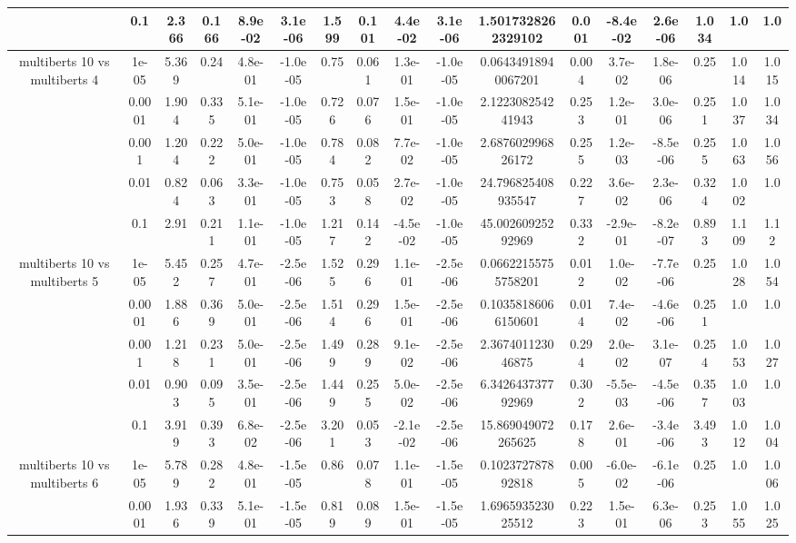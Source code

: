 \begin{tabular}{|c|c|c|c|c|c|c|c|c|c|c|c|c|c|c|c|c|}
 & 0.1 & 2.366 & 0.166 & 8.9e-02 & 3.1e-06 & 1.599 & 0.101 & 4.4e-02 & 3.1e-06 & 1.5017328262329102 & 0.001 & -8.4e-02 & 2.6e-06 & 1.034 & 1.0 & 1.0 \\
\hline
\multirow{5}{*}{multiberts 10 vs multiberts 4} & 1e-05 & 5.369 & 0.24 & 4.8e-01 & -1.0e-05 & 0.75 & 0.061 & 1.3e-01 & -1.0e-05 & 0.06434918940067201 & 0.004 & 3.7e-02 & 1.8e-06 & 0.25 & 1.014 & 1.015 \\
 & 0.0001 & 1.904 & 0.335 & 5.1e-01 & -1.0e-05 & 0.726 & 0.076 & 1.5e-01 & -1.0e-05 & 2.122308254241943 & 0.253 & 1.2e-01 & 3.0e-06 & 0.251 & 1.037 & 1.034 \\
 & 0.001 & 1.204 & 0.222 & 5.0e-01 & -1.0e-05 & 0.784 & 0.082 & 7.7e-02 & -1.0e-05 & 2.687602996826172 & 0.255 & 1.2e-03 & -8.5e-06 & 0.255 & 1.063 & 1.056 \\
 & 0.01 & 0.824 & 0.063 & 3.3e-01 & -1.0e-05 & 0.753 & 0.058 & 2.7e-02 & -1.0e-05 & 24.796825408935547 & 0.227 & 3.6e-02 & 2.3e-06 & 0.324 & 1.002 & 1.0 \\
 & 0.1 & 2.91 & 0.211 & 1.1e-01 & -1.0e-05 & 1.217 & 0.142 & -4.5e-02 & -1.0e-05 & 45.00260925292969 & 0.332 & -2.9e-01 & -8.2e-07 & 0.893 & 1.109 & 1.12 \\
\hline
\multirow{5}{*}{multiberts 10 vs multiberts 5} & 1e-05 & 5.452 & 0.257 & 4.7e-01 & -2.5e-06 & 1.525 & 0.296 & 1.1e-01 & -2.5e-06 & 0.06622155755758201 & 0.012 & 1.0e-02 & -7.7e-06 & 0.25 & 1.028 & 1.054 \\
 & 0.0001 & 1.886 & 0.369 & 5.0e-01 & -2.5e-06 & 1.514 & 0.296 & 1.5e-01 & -2.5e-06 & 0.10358186066150601 & 0.014 & 7.4e-02 & -4.6e-06 & 0.251 & 1.0 & 1.0 \\
 & 0.001 & 1.218 & 0.231 & 5.0e-01 & -2.5e-06 & 1.499 & 0.289 & 9.1e-02 & -2.5e-06 & 2.367401123046875 & 0.294 & 2.0e-02 & 3.1e-07 & 0.254 & 1.053 & 1.027 \\
 & 0.01 & 0.903 & 0.095 & 3.5e-01 & -2.5e-06 & 1.449 & 0.255 & 5.0e-02 & -2.5e-06 & 6.342643737792969 & 0.302 & -5.5e-03 & -4.5e-06 & 0.357 & 1.003 & 1.0 \\
 & 0.1 & 3.919 & 0.393 & 6.8e-02 & -2.5e-06 & 3.201 & 0.053 & -2.1e-02 & -2.5e-06 & 15.869049072265625 & 0.178 & 2.6e-01 & -3.4e-06 & 3.493 & 1.012 & 1.004 \\
\hline
\multirow{5}{*}{multiberts 10 vs multiberts 6} & 1e-05 & 5.789 & 0.282 & 4.8e-01 & -1.5e-05 & 0.86 & 0.078 & 1.1e-01 & -1.5e-05 & 0.102372787892818 & 0.005 & -6.0e-02 & -6.1e-06 & 0.25 & 1.0 & 1.006 \\
 & 0.0001 & 1.936 & 0.339 & 5.1e-01 & -1.5e-05 & 0.819 & 0.089 & 1.5e-01 & -1.5e-05 & 1.696593523025512 & 0.223 & 1.5e-01 & 6.3e-06 & 0.253 & 1.055 & 1.025 \\

\end{tabular}
